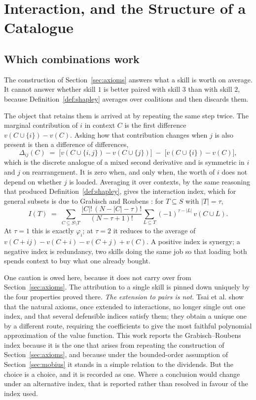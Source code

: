 \documentclass[11pt]{article}
\theoremstyle{plain}
\theoremstyle{definition}
\theoremstyle{remark}
\begin{document}
\section{Interaction, and the Structure of a Catalogue}

\subsection{Which combinations work}

The construction of Section~\ref{sec:axioms} answers what a skill is worth on average. It cannot answer whether skill $1$ is better paired with skill $3$ than with skill $2$, because Definition~\ref{def:shapley} averages over coalitions and then discards them.

The object that retains them is arrived at by repeating the same step twice. The marginal contribution of $i$ in context $C$ is the first difference $v(C \cup \{i\}) - v(C)$. Asking how that contribution changes when $j$ is also present is then a difference of differences,
\[
\Delta_{ij}(C) \;=\; \big[v(C\cup\{i,j\}) - v(C \cup \{j\})\big] \;-\; \big[v(C\cup\{i\}) - v(C)\big],
\]
which is the discrete analogue of a mixed second derivative and is symmetric in $i$ and $j$ on rearrangement. It is zero when, and only when, the worth of $i$ does not depend on whether $j$ is loaded. Averaging it over contexts, by the same reasoning that produced Definition~\ref{def:shapley}, gives the interaction index, which for general subsets is due to Grabisch and Roubens \cite{grabisch}: for $T \subseteq S$ with $|T| = \tau$,
\[
I(T) \;=\; \sum_{C \subseteq S \setminus T} \frac{|C|!\,(N-|C|-\tau)!}{(N-\tau+1)!} \sum_{L \subseteq T} (-1)^{\tau - |L|}\, v(C \cup L).
\]
At $\tau = 1$ this is exactly $\varphi_i$; at $\tau = 2$ it reduces to the average of $v(C{+}ij) - v(C{+}i) - v(C{+}j) + v(C)$. A positive index is synergy; a negative index is redundancy, two skills doing the same job so that loading both spends context to buy what one already bought.

One caution is owed here, because it does not carry over from Section~\ref{sec:axioms}. The attribution to a single skill is pinned down uniquely by the four properties proved there. \emph{The extension to pairs is not.} Tsai et al. \cite{faithshap} show that the natural axioms, once extended to interactions, no longer single out one index, and that several defensible indices satisfy them; they obtain a unique one by a different route, requiring the coefficients to give the most faithful polynomial approximation of the value function. This work reports the Grabisch--Roubens index because it is the one that arises from repeating the construction of Section~\ref{sec:axioms}, and because under the bounded-order assumption of Section~\ref{sec:mobius} it stands in a simple relation to the dividends. But the choice is a choice, and it is recorded as one. Where a conclusion would change under an alternative index, that is reported rather than resolved in favour of the index used.
\end{document}
